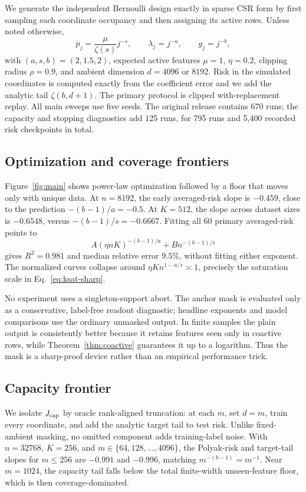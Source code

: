 \documentclass[letterpaper]{article}
\begin{document}
We generate the independent Bernoulli design exactly in sparse CSR form by
first sampling each coordinate occupancy and then assigning its active rows.
Unless noted otherwise,
\[
p_j=\frac{\mu}{\zeta(s)}j^{-s},\qquad
\lambda_j=j^{-a},\qquad g_j=j^{-b},
\]
with $(a,s,b)=(2,1.5,2)$, expected active features $\mu=1$, $\eta=0.2$,
clipping radius $\rho=0.9$, and ambient dimension $d=4096$ or $8192$. Risk in
the simulated coordinates is computed exactly from the coefficient error and
we add the analytic tail $\zeta(b,d+1)$. The primary protocol is clipped
with-replacement replay. All main sweeps use five seeds. The original release
contains 670 runs; the capacity and stopping diagnostics add 125 runs, for 795
runs and 5,400 recorded risk checkpoints in total.

\subsection{Optimization and coverage frontiers}

Figure~\ref{fig:main} shows power-law optimization followed by a floor that
moves only with unique data. At $n=8192$, the early averaged-risk slope is
$-0.459$, close to the prediction $-(b-1)/a=-0.5$. At $K=512$, the slope across
dataset sizes is $-0.6548$, versus $-(b-1)/s=-0.6667$. Fitting all 60 primary
averaged-risk points to
\begin{equation}
A(\eta nK)^{-(b-1)/a}+Bn^{-(b-1)/s}
\label{eq:two-term-fit}
\end{equation}
gives $R^2=0.981$ and median relative error $9.5\%$, without fitting either
exponent. The normalized curves collapse around
$\eta Kn^{1-a/s}\asymp1$, precisely the saturation scale in
Eq.~\eqref{eq:ksat-sharp}.

No experiment uses a singleton-support abort. The anchor mask is evaluated only
as a conservative, label-free readout diagnostic; headline exponents and model
comparisons use the ordinary unmasked output. In finite samples the plain output
is consistently better because it retains features seen only in coactive rows,
while Theorem~\ref{thm:coactive} guarantees it up to a logarithm. Thus the mask
is a sharp-proof device rather than an empirical performance trick.

\subsection{Capacity frontier}

We isolate $J_{\rm cap}$ by oracle rank-aligned truncation: at each $m$, set
$d=m$, train every coordinate, and add the analytic target tail to test risk.
Unlike fixed-ambient masking, no omitted component adds training-label noise.
With $n=32768$, $K=256$, and $m\in\{64,128,\ldots,4096\}$, the
Polyak-risk and target-tail slopes for $m\le256$ are $-0.991$ and $-0.996$,
matching $m^{-(b-1)}=m^{-1}$. Near $m=1024$, the capacity tail falls below the
total finite-width unseen-feature floor, which is then coverage-dominated.
\end{document}
